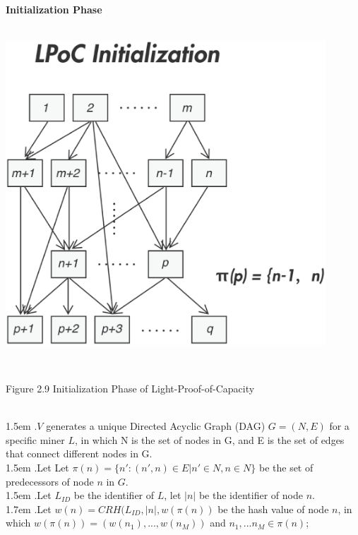\documentclass[10pt,a4paper]{article}
\begin{document}
\noindent   
 {\bf Initialization Phase }\\\\
\centerline{\includegraphics[width=340pt]{fig9}}
 \\ \centerline{{Figure 2.9 Initialization Phase of Light-Proof-of-Capacity}}
 \vspace{-1.5em}
\\

\hangindent 1.5em
.\quad $V$ generates a unique Directed Acyclic Graph (DAG) $G=(N, E)$ for a specific miner $L$, in which N is the set of nodes in G, and E is the set of edges that connect different nodes in G.
\vspace{-0.8em}
\\

\hangindent 1.5em
.\quad Let Let $\pi(n)=\{n':(n',n)\in E|n'\in N, n\in N\}$ be the set of predecessors of node $n$ in $G$.
\vspace{-0.8em}
\\

\hangindent 1.5em
.\quad Let $L_{ID}$ be the identifier of $L$, let $|n|$ be the identifier of node $n$.
\vspace{-0.8em}
\\

\hangindent 1.7em
.\quad Let $w(n)=CRH(L_{ID}, |n|, w(\pi(n))$ be the hash value of node $n$, in which $w(\pi(n))=(w(n_{1}),...,w(n_{M}))$ and $n_{1},...n_{M} \in \pi(n)$;
\vspace{-0.8em}
\\
\end{document}
